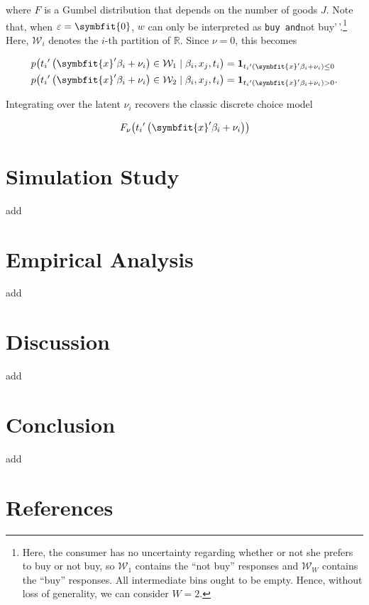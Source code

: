 \documentclass[
  letterpaper,
  DIV=11,
  numbers=noendperiod]{scrartcl}
\newlength{\cslhangindent}
\newenvironment{CSLReferences}[2] %
 {\begin{list}{}{%
  \setlength{\itemindent}{0pt}
  \setlength{\leftmargin}{0pt}
  \setlength{\parsep}{0pt}
  \ifodd #1
   \setlength{\leftmargin}{\cslhangindent}
   \setlength{\itemindent}{-1\cslhangindent}
  \fi
  \setlength{\itemsep}{#2\baselineskip}}}
 {\end{list}}
\begin{document}
where \(F\) is a Gumbel distribution that depends on the number of goods
\(J\). Note that, when \(\varepsilon = \symbfit{0}\), \(w\) can only be
interpreted as \texttt{buy\textquotesingle{}\textquotesingle{}\ and}not
buy'\,'.\footnote{Here, the consumer has no uncertainty regarding whether or not she prefers to buy or not buy, so $\mathcal{W}_1$ contains the ``not buy'' responses and $\mathcal{W}_W$ contains the ``buy'' responses. All intermediate bins ought to be empty. Hence, without loss of generality, we can consider $W=2$.}
Here, \(\mathcal{W}_i\) denotes the \(i\)-th partition of
\(\mathbb{R}\). Since \(\nu=0\), this becomes

\[
\begin{align}
    p\mleft({t_i}'\left(\symbfit{x}'\beta_i+\nu_i\right)\in{}\mathcal{W}_1 \mid \beta_i,x_j,t_i\mright) &= \mathbf{1}_{{t_i}'\left(\symbfit{x}'\beta_i+\nu_i\right) \le 0}\\
    p\mleft({t_i}'\left(\symbfit{x}'\beta_i+\nu_i\right)\in \mathcal{W}_2 \mid \beta_i,x_j,t_i\mright) &= \mathbf{1}_{{t_i}'\left(\symbfit{x}'\beta_i+\nu_i\right) > 0}.
\end{align}
\]

Integrating over the latent \(\nu_{i}\) recovers the classic discrete
choice model

\[
F_\nu\mleft({t_i}'\left(\symbfit{x}'\beta_i+\nu_i\right)\mright)
\]

\section{Simulation Study}\label{sec-simstudy}

add

\section{Empirical Analysis}\label{sec-analysis}

add

\section{Discussion}\label{sec-discussion}

add

\section{Conclusion}\label{sec-conclusion}

add

\section*{References}\label{references}

\label{refs}
\begin{CSLReferences}{0}{1}
\end{CSLReferences}
\end{document}
